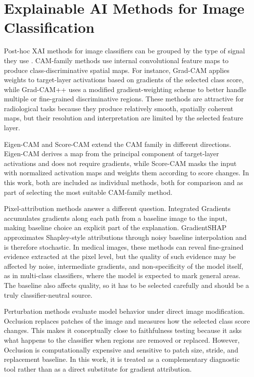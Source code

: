\hypertarget{explainable-ai-methods-for-image-classification}{%
	\section{Explainable AI Methods for Image
		Classification}\label{explainable-ai-methods-for-image-classification}}

Post-hoc XAI methods for image classifiers can be grouped by the type of
signal they use \cite{ref-medical-xai-review}. CAM-family methods use
internal convolutional feature maps to produce class-discriminative
spatial maps. For instance, Grad-CAM \cite{ref-gradcam} applies weights to
target-layer activations based on gradients of the selected class score, while
Grad-CAM++ \cite{ref-gradcampp} uses a modified gradient-weighting
scheme to better handle multiple or fine-grained discriminative regions.
These methods are attractive for radiological tasks because they produce
relatively smooth, spatially coherent maps, but their resolution and
interpretation are limited by the selected feature layer.

Eigen-CAM \cite{ref-eigen-cam} and Score-CAM
\cite{ref-scorecam} extend the CAM family in different directions.
Eigen-CAM derives a map from the principal component of
target-layer activations and does not require gradients, while
Score-CAM masks the input with normalized activation maps and
weights them according to score changes. In this work, both
are included as individual methods, both for comparison and as part of selecting the most suitable CAM-family
method.

Pixel-attribution methods answer a different question. 
Integrated Gradients \cite{ref-integrated-gradients}
accumulates gradients along each path from a baseline image to the input,
making baseline choice an explicit part of the explanation.
GradientSHAP approximates Shapley-style attributions
\cite{ref-shap} through noisy baseline interpolation and is therefore
stochastic. 
In medical images, these methods can reveal fine-grained evidence extracted at the
pixel level, but the quality of such evidence may be affected by noise, intermediate gradients,
and non-specificity of the model itself, as in multi-class classifiers, where
the model is expected to mark general areas. The baseline also affects
quality, so it has to be selected carefully and should be a truly classifier-neutral
source.

Perturbation methods evaluate model behavior under direct image
modification. Occlusion \cite{ref-occlusion-zeiler} replaces
patches of the image and measures how the selected class score changes.
This makes it conceptually close to faithfulness testing because it asks
what happens to the classifier when regions are removed or replaced.
However, Occlusion is computationally expensive and sensitive to patch
size, stride, and replacement baseline. In this work, it is treated
as a complementary diagnostic tool rather than as a direct
substitute for gradient attribution.

